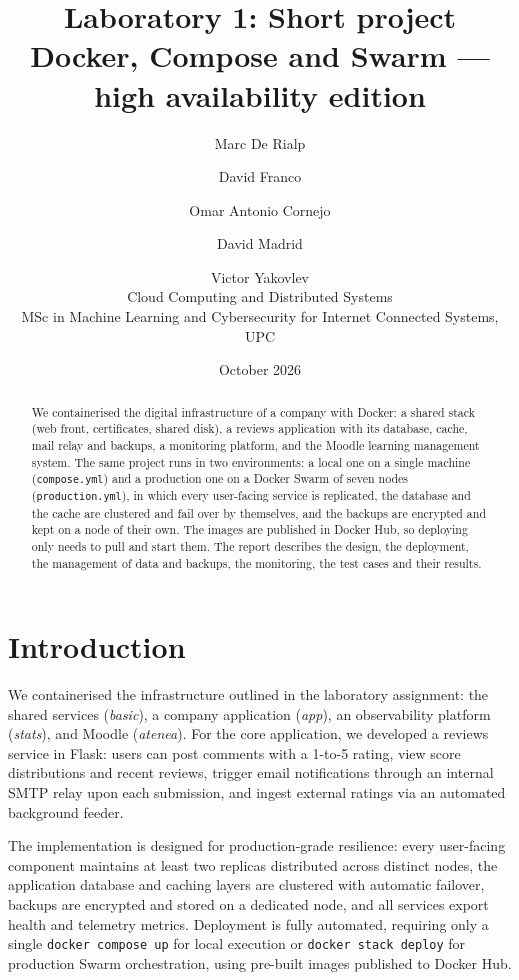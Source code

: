 \documentclass[11pt,a4paper]{article}
\title{Laboratory 1: Short project\\[2pt]\large Docker, Compose and Swarm --- high availability edition}
\author{Marc De Rialp \and David Franco \and Omar Antonio Cornejo \and David Madrid \and Victor Yakovlev\\[4pt]
\small Cloud Computing and Distributed Systems\\ MSc in Machine Learning and Cybersecurity for Internet Connected Systems, UPC}
\date{October 2026}
\begin{document}
\maketitle

\begin{abstract}
We containerised the digital infrastructure of a company with Docker: a shared stack
(web front, certificates, shared disk), a reviews application with its database, cache,
mail relay and backups, a monitoring platform, and the Moodle learning management system.
The same project runs in two environments: a local one on a single machine
(\texttt{compose.yml}) and a production one on a Docker Swarm of seven nodes
(\texttt{production.yml}), in which every user-facing service is replicated, the database
and the cache are clustered and fail over by themselves, and the backups are encrypted and
kept on a node of their own. The images are published in Docker Hub, so deploying only
needs to pull and start them. The report describes the design, the deployment, the
management of data and backups, the monitoring, the test cases and their results.
\end{abstract}

\newpage
\tableofcontents
\newpage

\section{Introduction}

We containerised the infrastructure outlined in the laboratory assignment: the shared services
(\emph{basic}), a company application (\emph{app}), an observability platform
(\emph{stats}), and Moodle (\emph{atenea}). For the core application, we developed a reviews
service in Flask: users can post comments with a 1-to-5 rating, view score distributions and
recent reviews, trigger email notifications through an internal SMTP relay upon each submission,
and ingest external ratings via an automated background feeder.

The implementation is designed for production-grade resilience: every user-facing component
maintains at least two replicas distributed across distinct nodes, the application database
and caching layers are clustered with automatic failover, backups are encrypted and stored on
a dedicated node, and all services export health and telemetry metrics. Deployment is
fully automated, requiring only a single \texttt{docker compose up} for local execution or
\texttt{docker stack deploy} for production Swarm orchestration, using pre-built images published
to Docker Hub.
\end{document}
